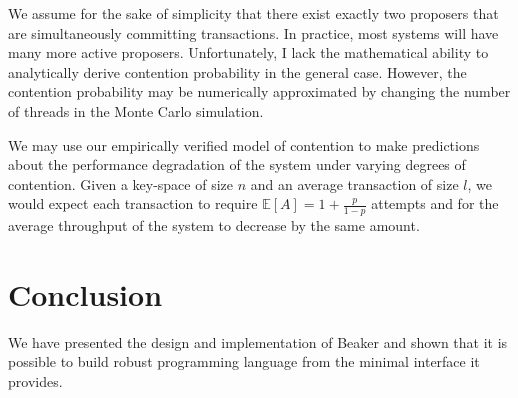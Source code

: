 \documentclass{article}
\begin{document}
    We assume for the sake of simplicity that there exist exactly two proposers that are
    simultaneously committing transactions. In practice, most systems will have many more active
    proposers. Unfortunately, I lack the mathematical ability to analytically derive contention
    probability in the general case. However, the contention probability may be numerically
    approximated by changing the number of threads in the Monte Carlo simulation.

    We may use our empirically verified model of contention to make predictions about the performance
    degradation of the system under varying degrees of contention. Given a key-space of size $n$ and
    an average transaction of size $l$, we would expect each transaction to require
    $\mathbb{E}[A] = 1 + \frac{p}{1 - p}$ attempts and for the average throughput of the system to
    decrease by the same amount.

  \section{Conclusion}
  We have presented the design and implementation of Beaker and shown that it is possible to build
  robust programming language from the minimal interface it provides.
\end{document}
